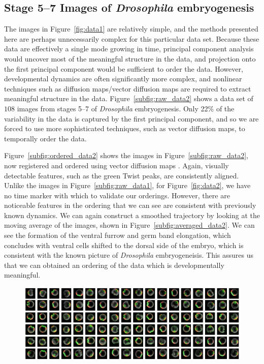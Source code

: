 \documentclass{pnastwo}
\begin{document}
\begin{article}
\subsection{Stage 5--7 Images of {\it Drosophila} embryogenesis}

The images in Figure~\ref{fig:data1} are relatively simple, and the methods presented here are perhaps unnecessarily complex for this particular data set. 
%
Because these data are effectively a single mode growing in time,
principal component analysis \cite{shlens2005tutorial} would uncover most of the meaningful structure in the data, and projection onto the first principal component would be sufficient to order the data.
%
However, developmental dynamics are often significantly more complex, and nonlinear techniques such as diffusion maps/vector diffusion maps are required to extract meaningful structure in the data. 
%
Figure~\ref{subfig:raw_data2} shows a data set of $108$ images from stages 5--7 of {\it Drosophila} embryogenesis.
%
Only 22\% of the variability in the data is captured by the first principal component, and so we are forced to use more sophisticated techniques, such as vector diffusion maps, to temporally order the data.

Figure~\ref{subfig:ordered_data2} shows the images in Figure~\ref{subfig:raw_data2}, now registered and ordered using vector diffusion maps \cite{singer2012vector}.
%
Again, visually detectable features, such as the green Twist peaks, are consistently aligned. 
%
Unlike the images in Figure~\ref{subfig:raw_data1}, 
for Figure~\ref{fig:data2}, we have no time marker with which to validate our orderings.
%
However, there are noticeable features in the ordering that we can see are consistent with previously known dynamics.
%
We can again construct a smoothed trajectory by looking at the moving average of the images, shown in Figure~\ref{subfig:averaged_data2}.
%
We can see the formation of the ventral furrow and germ band elongation, which concludes with ventral cells shifted to the dorsal side of the embryo, which is consistent with the known picture of {\it Drosophila} embryogeneisis. 
%
This assures us that we can obtained an ordering of the data which is developmentally meaningful. 

\newpage
\begin{figure}[t]
\includegraphics[width=16.8cm]{raw_data2}


\end{figure}
\end{article}
\end{document}
